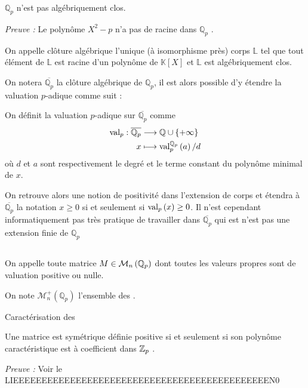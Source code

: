 \begin{proposition}
	$\mathbb{Q}_{p} $ n'est pas algébriquement clos.
\end{proposition}
\textit{Preuve :} Le polynôme $X^2 - p$ n'a pas de racine dans $\mathbb{Q}_{p}$ \hfill \qedsymbol.

\begin{definition}
	On appelle clôture algébrique l'unique (à isomorphisme près) corps $\mathbb{L}$ tel que tout élément de $\mathbb{L}$ est racine d'un polynôme de $\mathbb{K}[X]$ et $\mathbb{L}$ est algébriquement clos.
\end{definition}

On notera $\overline{\mathbb{Q}_{p} }$ la clôture algébrique de $\mathbb{Q}_{p}$, il est alors possible d'y étendre la valuation $p$-adique comme suit :

\begin{definition}
	On définit la valuation $p$-adique sur $\overline{\mathbb{Q}_{p} }$ comme 
\begin{align*}
	\text{val}_p : \overline{\mathbb{Q}_{p}} & \longrightarrow \mathbb{Q}\cup \{+\infty\} \\
x & \longmapsto \text{val}_p^{\mathbb{Q}_{p} } \left(a\right)/d
\end{align*}
	où $d$ et $a$ sont respectivement le degré et le terme constant du polynôme minimal de $x$.
\end{definition}

On retrouve alors une notion de positivité dans l'extension de corps et étendra à $\overline{\mathbb{Q}_{p}} $ la notation $x\ge 0$ si et seulement si $\text{val}_p\left(x\right)\ge 0$. Il n'est cependant informatiquement pas très pratique de travailler dans $\overline{\mathbb{Q}_{p} }$ qui est n'est pas une extension finie de $\mathbb{Q}_{p} $ %

\subsection{\Mats} 

\begin{definition}
	On appelle \mat toute matrice $M \in \mathcal{M}_n\left( \mathbb{Q}_p \right) $ dont toutes les valeurs propres sont de valuation positive ou nulle.

	On note $ \mathcal{M}_n^+\left( \mathbb{Q}_p \right)$ l'ensemble des \mats.
\end{definition}
\begin{propriete}
	\label{caracsnp}
	Caractérisation des \mats

	Une matrice est symétrique définie positive si et seulement si son polynôme caractéristique est à coefficient dans $ \mathbb {Z}_p $ .
	
\end{propriete}
	\textit{Preuve :} Voir le LIEEEEEEEEEEEEEEEEEEEEEEEEEEEEEEEEEEEEEEEEEEEEEN0

